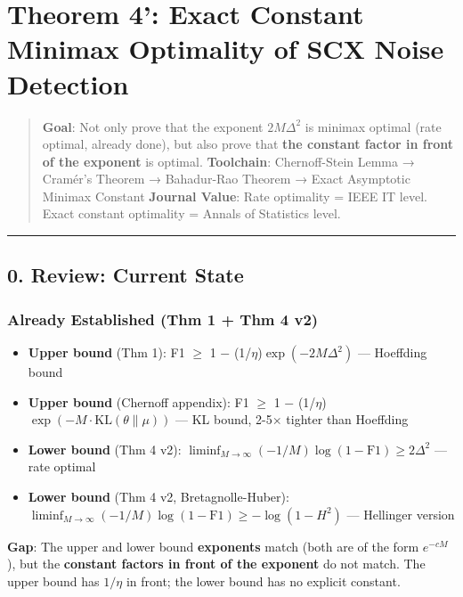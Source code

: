 \documentclass[
  12pt,
]{ctexart}
\author{SCX}
\date{2026}
\providecommand{\tightlist}{%
  \setlength{\itemsep}{0pt}\setlength{\parskip}{0pt}}
\begin{document}
\section{Theorem 4': Exact Constant Minimax Optimality of SCX Noise
Detection}\label{theorem-4-exact-constant-minimax-optimality-of-scx-noise-detection}

\begin{quote}
\textbf{Goal}: Not only prove that the exponent \(2M\Delta^2\) is minimax optimal (rate optimal, already done), but also prove that \textbf{the constant factor in front of the exponent} is optimal.
\textbf{Toolchain}: Chernoff-Stein Lemma → Cramér's Theorem → Bahadur-Rao Theorem → Exact Asymptotic Minimax Constant
\textbf{Journal Value}: Rate optimality = IEEE IT level. Exact constant optimality = Annals of Statistics level.
\end{quote}

\begin{center}\rule{0.5\linewidth}{0.5pt}\end{center}

\subsection{0. Review: Current State}\label{review-current-state}

\subsubsection{Already Established (Thm 1 + Thm 4 v2)}\label{already-established-thm-1-thm-4-v2}

\begin{itemize}
\tightlist
\item
  \textbf{Upper bound} (Thm 1): F1 \(\ge\) 1 \(-\) (1/\(\eta\))\(\exp(-2M\Delta^2)\) --- Hoeffding bound
\item
  \textbf{Upper bound} (Chernoff appendix): F1 \(\ge\) 1 \(-\) (1/\(\eta\))\(\exp(-M\cdot\text{KL}(\theta\|\mu))\) --- KL bound, 2-5\(\times\) tighter than Hoeffding
\item
  \textbf{Lower bound} (Thm 4 v2): \(\liminf_{M\to\infty} (-1/M) \log(1-\text{F1}) \ge 2\Delta^2\) --- rate optimal
\item
  \textbf{Lower bound} (Thm 4 v2, Bretagnolle-Huber): \(\liminf_{M\to\infty} (-1/M) \log(1-\text{F1}) \ge -\log(1-H^2)\) --- Hellinger version
\end{itemize}

\textbf{Gap}: The upper and lower bound \textbf{exponents} match (both are of the form \(e^{-cM}\)), but the \textbf{constant factors in front of the exponent} do not match. The upper bound has \(1/\eta\) in front; the lower bound has no explicit constant.
\end{document}
